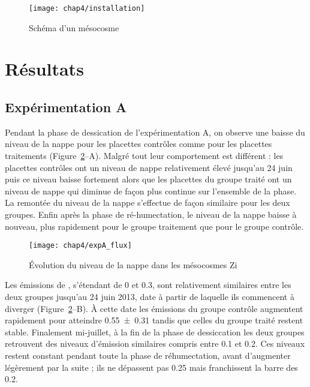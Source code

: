 \begin{figure}
\centering
\texttt{[image: chap4/installation]}
\caption{Schéma d'un mésocosme}
\label{fig:mesocarte}
\end{figure}

\section{Résultats}

\subsection{Expérimentation A}

Pendant la phase de dessication de l'expérimentation A, on observe une baisse du niveau de la nappe pour les placettes contrôles comme pour les placettes traitements (Figure~\ref{fig:HMzi}--A).
Malgré tout leur comportement est différent : les placettes contrôles ont un niveau de nappe relativement élevé jusqu'au 24 juin puis ce niveau baisse fortement alors que les placettes du groupe traité ont un niveau de nappe qui diminue de façon plus continue sur l'ensemble de la phase.
La remontée du niveau de la nappe s'effectue de façon similaire pour les deux groupes.
Enfin après la phase de ré-humectation, le niveau de la nappe baisse à nouveau, plus rapidement pour le groupe traitement que pour le groupe contrôle.


\begin{figure}
\centering
\texttt{[image: chap4/expA\_flux]}
\caption{Évolution du niveau de la nappe dans les mésocosmes Zi}
\label{fig:HMzi}
\end{figure}


Les émissions de \chh, s'étendant de 0 et \SI{0.3}{\uml}, sont relativement similaires entre les deux groupes jusqu'au 24 juin 2013, date à partir de laquelle ils commencent à diverger (Figure~\ref{fig:HMzi}--B).
À cette date les émissions du groupe contrôle augmentent rapidement pour atteindre \SI{0.55(031)}{\uml} tandis que celles du groupe traité restent stable.
Finalement mi-juillet, à la fin de la phase de dessiccation les deux groupes retrouvent des niveaux d'émission similaires compris entre \num{0.1} et \SI{0.2}{\uml}.
Ces niveaux restent constant pendant toute la phase de réhumectation, avant d'augmenter légèrement par la suite ; ils ne dépassent pas \SI{0.25}{\uml} mais franchissent la barre des \SI{0.2}{\uml}.

